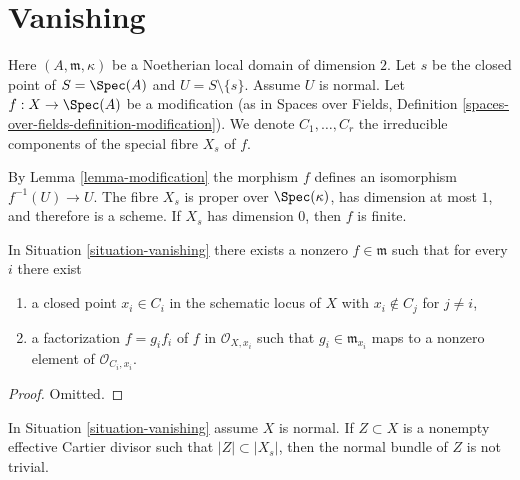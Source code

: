 \section{Vanishing}
\label{section-vanishing}


\begin{situation}
\label{situation-vanishing}
Here $(A, \mathfrak m, \kappa)$ be a Noetherian local domain of
dimension $2$. Let $s$ be the closed point of $S = \Spec(A)$ and
$U = S \setminus \{s\}$. Assume $U$ is normal.
Let $f : X \to \Spec(A)$ be a modification
(as in Spaces over Fields, Definition
\ref{spaces-over-fields-definition-modification}).
We denote $C_1, \ldots, C_r$ the irreducible
components of the special fibre $X_s$ of $f$.
\end{situation}

\noindent
By Lemma \ref{lemma-modification} the morphism $f$ defines an
isomorphism $f^{-1}(U) \to U$. The fibre $X_s$ is proper over $\Spec(\kappa)$,
has dimension at most $1$, and therefore is a scheme. If $X_s$ has
dimension $0$, then $f$ is finite.

\begin{lemma}
\label{lemma-nice-meromorphic-function}
In Situation \ref{situation-vanishing} there exists a nonzero
$f \in \mathfrak m$ such that for every $i$ there exist
\begin{enumerate}
\item a closed point $x_i \in C_i$ in the schematic locus of $X$
with $x_i \not \in C_j$ for $j \not = i$,
\item a factorization $f = g_i f_i$ of $f$ in $\mathcal{O}_{X, x_i}$
such that $g_i \in \mathfrak m_{x_i}$ maps to a nonzero element
of $\mathcal{O}_{C_i, x_i}$.
\end{enumerate}
\end{lemma}

\begin{proof}
Omitted.
\end{proof}

\begin{lemma}
\label{lemma-nontrivial-normal-bundle}
In Situation \ref{situation-vanishing} assume $X$ is normal.
If $Z \subset X$ is a nonempty effective Cartier divisor such that
$|Z| \subset |X_s|$, then the normal bundle of $Z$ is not trivial.
\end{lemma}

